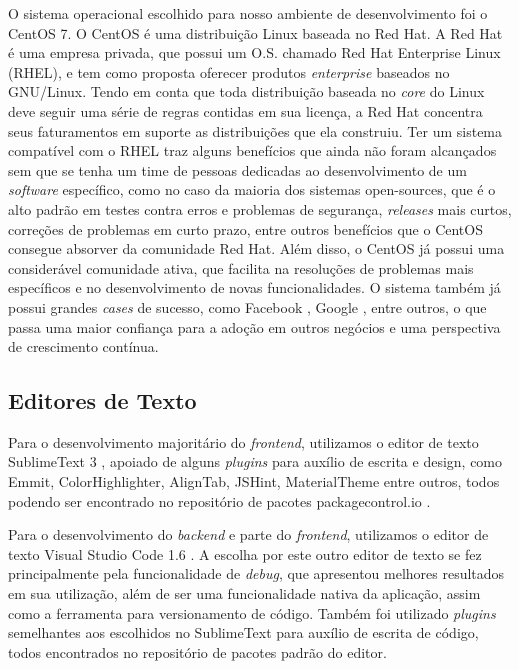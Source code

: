 O sistema operacional escolhido para nosso ambiente de desenvolvimento foi o CentOS 7. O CentOS é uma distribuição Linux baseada no Red Hat. A Red Hat é uma empresa privada, que possui um O.S. chamado Red Hat Enterprise Linux (RHEL), e tem como proposta oferecer produtos \textit{enterprise} baseados no GNU/Linux. Tendo em conta que toda distribuição baseada no \textit{core} do Linux deve seguir uma série de regras contidas em sua licença, a Red Hat concentra seus faturamentos em suporte as distribuições que ela construiu. Ter um sistema compatível com o RHEL traz alguns benefícios que ainda não foram alcançados sem que se tenha um time de pessoas dedicadas ao desenvolvimento de um \textit{software} específico, como no caso da maioria dos sistemas open-sources, que é o alto padrão em testes contra erros e problemas de segurança, \textit{releases} mais curtos, correções de problemas em curto prazo, entre outros benefícios que o CentOS consegue absorver da comunidade Red Hat. Além disso, o CentOS já possui uma considerável comunidade ativa, que facilita na resoluções de problemas mais específicos e no desenvolvimento de novas funcionalidades. O sistema também já possui grandes \textit{cases} de sucesso, como Facebook \cite{facebook-distro}, Google \cite{google-redhat}, entre outros, o que passa uma maior confiança para a adoção em outros negócios e uma perspectiva de crescimento contínua.

\subsection{Editores de Texto}
Para o desenvolvimento majoritário do \textit{frontend}, utilizamos o editor de texto SublimeText 3 \cite{sublime}, apoiado de alguns \textit{plugins} para auxílio de escrita e design, como Emmit, ColorHighlighter, AlignTab, JSHint, MaterialTheme entre outros, todos podendo ser encontrado no repositório de pacotes packagecontrol.io \cite{packagecontrolio}.

Para o desenvolvimento do \textit{backend} e parte do \textit{frontend}, utilizamos o editor de texto Visual Studio Code 1.6 \cite{vscode}. A escolha por este outro editor de texto se fez principalmente pela funcionalidade de \textit{debug}, que apresentou melhores resultados em sua utilização, além de ser uma funcionalidade nativa da aplicação, assim como a ferramenta para versionamento de código. Também foi utilizado \textit{plugins} semelhantes aos escolhidos no SublimeText para auxílio de escrita de código, todos encontrados no repositório de pacotes padrão do editor.

